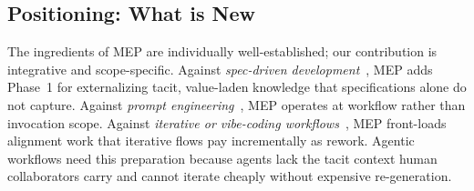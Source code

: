 \subsection{Positioning: What is New}
\label{sec:novelty}

The ingredients of MEP are individually well-established; our
contribution is integrative and scope-specific. Against
\emph{spec-driven development}~\cite{github2025speckit}, MEP adds
Phase~1 for externalizing tacit, value-laden knowledge that
specifications alone do not capture. Against \emph{prompt
engineering}~\cite{brown2020gpt3, wei2022chain, liu2023prompt}, MEP
operates at workflow rather than invocation scope. Against
\emph{iterative or vibe-coding workflows}~\cite{karpathy2025vibe,
huntley2025ralph}, MEP front-loads alignment work that iterative flows
pay incrementally as rework. Agentic workflows need this preparation
because agents lack the tacit context human collaborators carry and
cannot iterate cheaply without expensive re-generation.
